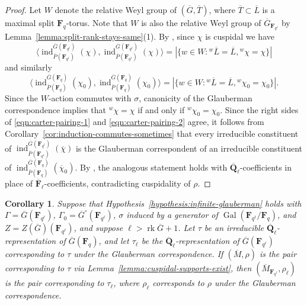 \documentclass[reqno]{amsart}
\numberwithin{equation}{subsection}
\newcommand{\F}{\mathbf{F}}
\newcommand{\Q}{\mathbf{Q}}
\newcommand{\Gal}{\operatorname{Gal}}
\newcommand{\ol}[1]{\overline{#1}}
\newcommand{\co}{\colon}
\DeclareMathOperator{\ind}{ind}
\DeclareMathOperator{\rk}{rk}
\newtheorem{cor}[thm]{Corollary}
\theoremstyle{remark}
\numberwithin{equation}{subsection}
\numberwithin{figure}{subsection}
\begin{document}
\begin{proof}
    Let $W$ denote the relative Weyl group of $(\ol G, \ol T)$, where $\ol T \subset \ol L$ is a maximal split $\F_q$-torus. Note that $W$ is also the relative Weyl group of $\ol G_{\F_{q^\ell}}$ by Lemma~\ref{lemma:split-rank-stays-same}(1). By \cite[Proposition~9.2.4]{Car85}, since $\chi$ is cuspidal we have 
    \begin{equation}\label{eqn:carter-pairing-1}
    \langle \ind_{\ol P(\F_{q^\ell})}^{\ol G(\F_{q^\ell})}(\chi), \ind_{\ol P(\F_{q^\ell})}^{\ol G(\F_{q^\ell})}(\chi)\rangle = |\{w \in W\co {}^w\ol L = \ol L, {}^w\chi = \chi\}|
    \end{equation}
    and similarly
    \begin{equation}\label{eqn:carter-pairing-2}
    \langle \ind_{\ol P(\F_q)}^{\ol G(\F_q)}(\chi_0), \ind_{\ol P(\F_q)}^{\ol G(\F_q)}(\chi_0)\rangle = |\{w \in W\co {}^w\ol L = \ol L, {}^w\chi_0 = \chi_0\}|.
    \end{equation}
    Since the $W$-action commutes with $\sigma$, canonicity of the Glauberman correspondence implies that ${}^w \chi = \chi$ if and only if ${}^w \chi_0 = \chi_0$. Since the right sides of \eqref{eqn:carter-pairing-1} and \eqref{eqn:carter-pairing-2} agree, it follows from Corollary~\ref{cor:induction-commutes-sometimes} that every irreducible constituent of $\ind_{\ol P(\F_{q^\ell})}^{\ol G(\F_{q^\ell})}(\ol\chi)$ is the Glauberman correspondent of an irreducible constituent of $\ind_{\ol P(\F_q)}^{\ol G(\F_q)}(\ol\chi_0)$. By \cite[Part~III, no.\ 15.5, Proposition~43]{Serre77}, the analogous statement holds with $\ol\Q_\ell$-coefficients in place of $\ol\F_\ell$-coefficients, contradicting cuspidality of $\rho$.
\end{proof}

\begin{cor}\label{cor:glauberman-cuspidal-support}
    Suppose that Hypothesis~\ref{hypothesis:infinite-glauberman} holds with $\Gamma = \ol G(\F_{q^\ell})$, $\Gamma_0 = \ol G^\circ(\F_{q^\ell})$, $\sigma$ induced by a generator of $\Gal(\F_{q^\ell}/\F_q)$, and $Z = Z(\ol G)(\F_{q^\ell})$, and suppose $\ell > \rk \ol G + 1$. Let $\tau$ be an irreducible $\ol\Q_\ell$-representation of $\ol G(\F_q)$, and let $\tau_\ell$ be the $\ol\Q_\ell$-representation of $\ol G(\F_{q^\ell})$ corresponding to $\tau$ under the Glauberman correspondence. If $(\ol M, \rho)$ is the pair corresponding to $\tau$ via Lemma~\ref{lemma:cuspidal-supports-exist}, then $(\ol M_{\F_{q^\ell}}, \rho_\ell)$ is the pair corresponding to $\tau_\ell$, where $\rho_\ell$ corresponds to $\rho$ under the Glauberman correspondence.
\end{cor}
\end{document}

